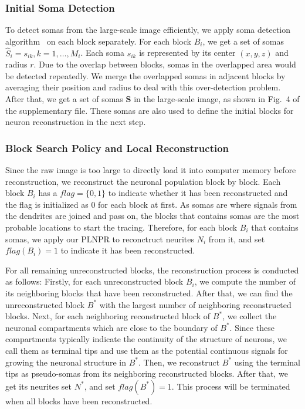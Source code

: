 \subsubsection{Initial Soma Detection}
\label{sec:soma}

To detect somas from the large-scale image efficiently, we apply soma detection algorithm~\cite{Quan2013} on each block separately. For each block $ B_{i} $, we get a set of somas $ \hat{S}_i = s_{ik}, k=1,\ldots,M_{i} $. Each soma $ s_{ik} $ is represented by its center $ (x,y,z) $ and radius $ r $.
Due to the overlap between blocks, somas in the overlapped area would be detected repeatedly.
We merge the overlapped somas in adjacent blocks by averaging their position and radius to deal with this over-detection problem.
After that, we get a set of somas $ \mathbf{S} $ in the large-scale image, as shown in Fig.~{4} of the supplementary file.
These somas are also used to define the initial blocks for neuron reconstruction in the next step.


\subsubsection{Block Search Policy and Local Reconstruction}
\label{sec:trace}

Since the raw image is too large to directly load it into computer memory before reconstruction, we reconstruct the neuronal population block by block.
%
Each block $ B_{i} $  has a $ flag =  \{0,1\}$ to indicate whether it has been reconstructed and the flag is initialized as $ 0 $ for each block at first.
%
As somas are where signals from the dendrites are joined and pass on, the blocks that contains somas are the most probable locations to start the tracing.
Therefore, for each block $ B_{i} $ that contains somas, we apply our PLNPR to reconctruct neurites $ N_{i} $ from it, and set $ flag(B_{i}) = 1 $ to indicate it has been reconstructed.

For all remaining unreconstructed blocks, the reconstruction process is conducted as follows:
%
Firstly, for each unreconstructed block $ B_{i} $, we compute the number of its neighboring blocks that have been reconstructed.  After that, we can find the unreconstructed block $ B^* $ with the largest number of neighboring reconstructed blocks.
%
Next, for each neighboring reconstructed block of $ B^* $, we collect the neuronal compartments which are close to the boundary of $ B^* $. Since these compartments typically indicate the continuity of the structure of neurons,  we call them as terminal tips and use them as the potential continuous signals for growing the neuronal structure in $ B^* $.
%
Then, we reconstruct $ B^* $ using the terminal tips as pseudo-somas from its neighboring reconstructed blocks.
After that, we get its neurites set $ N^* $, and set $ flag(B^*) = 1 $.
%
This process will be terminated when all blocks have been reconstructed.

